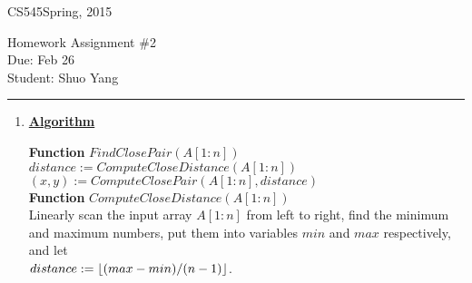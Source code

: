 \documentclass[11pt]{article}
\DeclarePairedDelimiter\floor{\lfloor}{\rfloor}
\def\CourseCode{CS545}
\def\AssignmentNo{2}
\def\DateHandedOut{Spring, 2015}
\def\DateDue{Feb 26}
\def\Author{Shuo Yang}
\begin{document}
\noindent

\CourseCode \hfill \DateHandedOut

\begin{center}
Homework Assignment \#\AssignmentNo\\
Due: \DateDue\\
Student: \Author\\
\end{center}

\hrule\smallskip

\begin{enumerate}

\item %
  \underline{\textbf{Algorithm}}

  \textbf{Function} $FindClosePair(A[1:n])$\\
  \-\hspace{2em} $distance := ComputeCloseDistance(A[1:n])$\\
  \-\hspace{2em} $(x,y) := ComputeClosePair(A[1:n], distance)$\\

  \textbf{Function} $ComputeCloseDistance(A[1:n])$\\
  \-\hspace{2em} Linearly scan the input array $A[1:n]$ from left to
  right, find the minimum and maximum numbers, put them into variables
  $min$ and $max$ respectively, and let\\ 
  \-\hspace{2em} $distance := \floor{(max-min)/(n-1)}$.\\ 


\end{enumerate}
\end{document}
